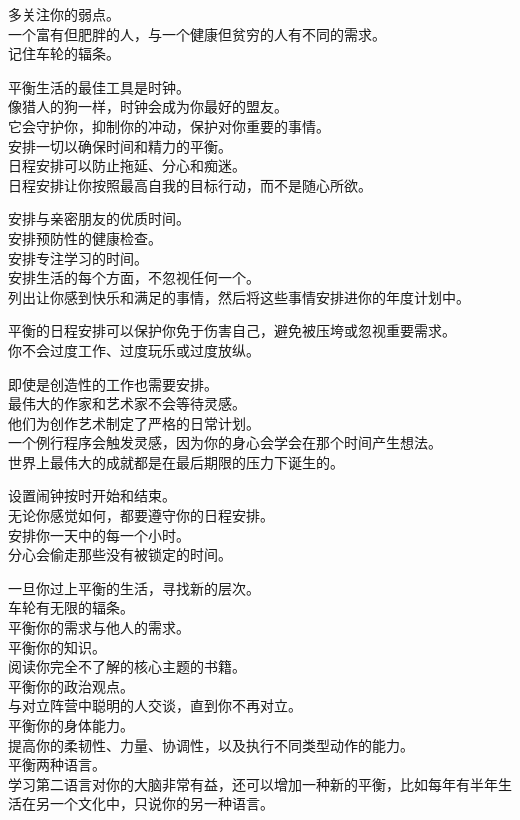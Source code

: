 \documentclass[
]{article}
\begin{document}
多关注你的弱点。\\
一个富有但肥胖的人，与一个健康但贫穷的人有不同的需求。\\
记住车轮的辐条。

平衡生活的最佳工具是时钟。\\
像猎人的狗一样，时钟会成为你最好的盟友。\\
它会守护你，抑制你的冲动，保护对你重要的事情。\\
安排一切以确保时间和精力的平衡。\\
日程安排可以防止拖延、分心和痴迷。\\
日程安排让你按照最高自我的目标行动，而不是随心所欲。

安排与亲密朋友的优质时间。\\
安排预防性的健康检查。\\
安排专注学习的时间。\\
安排生活的每个方面，不忽视任何一个。\\
列出让你感到快乐和满足的事情，然后将这些事情安排进你的年度计划中。

平衡的日程安排可以保护你免于伤害自己，避免被压垮或忽视重要需求。\\
你不会过度工作、过度玩乐或过度放纵。

即使是创造性的工作也需要安排。\\
最伟大的作家和艺术家不会等待灵感。\\
他们为创作艺术制定了严格的日常计划。\\
一个例行程序会触发灵感，因为你的身心会学会在那个时间产生想法。\\
世界上最伟大的成就都是在最后期限的压力下诞生的。

设置闹钟按时开始和结束。\\
无论你感觉如何，都要遵守你的日程安排。\\
安排你一天中的每一个小时。\\
分心会偷走那些没有被锁定的时间。

一旦你过上平衡的生活，寻找新的层次。\\
车轮有无限的辐条。\\
平衡你的需求与他人的需求。\\
平衡你的知识。\\
阅读你完全不了解的核心主题的书籍。\\
平衡你的政治观点。\\
与对立阵营中聪明的人交谈，直到你不再对立。\\
平衡你的身体能力。\\
提高你的柔韧性、力量、协调性，以及执行不同类型动作的能力。\\
平衡两种语言。\\
学习第二语言对你的大脑非常有益，还可以增加一种新的平衡，比如每年有半年生活在另一个文化中，只说你的另一种语言。
\end{document}
